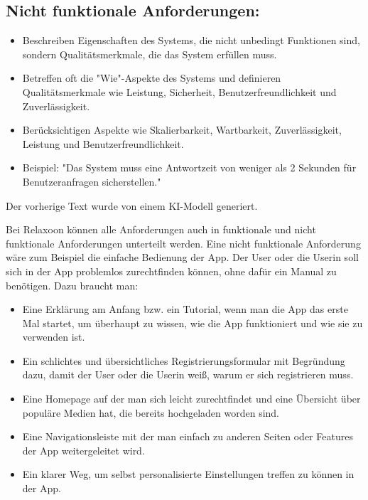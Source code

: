 \subsection{Nicht funktionale Anforderungen:}
\begin{itemize}
  \item Beschreiben Eigenschaften des Systems, die nicht unbedingt Funktionen sind, sondern Qualitätsmerkmale, die das System erfüllen muss.
  \item Betreffen oft die "Wie"-Aspekte des Systems und definieren Qualitätsmerkmale wie Leistung, Sicherheit, Benutzerfreundlichkeit und Zuverlässigkeit.
  \item Berücksichtigen Aspekte wie Skalierbarkeit, Wartbarkeit, Zuverlässigkeit, Leistung und Benutzerfreundlichkeit.
  \item Beispiel: "Das System muss eine Antwortzeit von weniger als 2 Sekunden für Benutzeranfragen sicherstellen."
\end{itemize}

Der vorherige Text wurde von einem KI-Modell generiert.\cite{chatgpt}

Bei Relaxoon können alle Anforderungen auch in funktionale und nicht funktionale Anforderungen unterteilt werden.
Eine nicht funktionale Anforderung wäre zum Beispiel die einfache Bedienung der App. Der User oder die Userin
soll sich in der App problemlos zurechtfinden können, ohne dafür ein Manual zu benötigen. Dazu braucht man:
\begin{itemize}
      \item  Eine Erklärung am Anfang bzw. ein Tutorial, wenn man die App das erste Mal startet, um überhaupt 
      zu wissen, wie die App funktioniert und wie sie zu verwenden ist.
      \item Ein schlichtes und übersichtliches Registrierungsformular mit Begründung dazu, damit der User oder
      die Userin weiß, warum er sich registrieren muss.
      \item Eine Homepage auf der man sich leicht zurechtfindet und eine Übersicht über populäre Medien hat, die
      bereits hochgeladen worden sind.
      \item Eine Navigationsleiste mit der man einfach zu anderen Seiten oder Features der App weitergeleitet wird.
      \item Ein klarer Weg, um selbst personalisierte Einstellungen treffen zu können in der App. 
\end{itemize}


